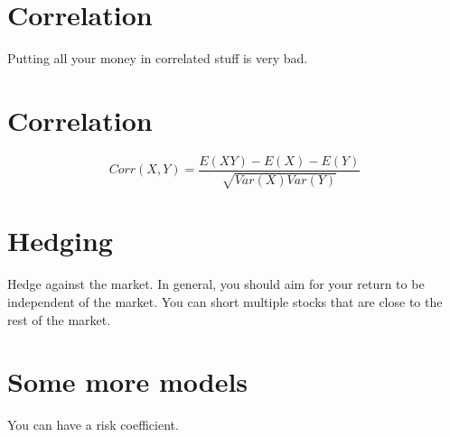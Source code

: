 \documentclass{article}
\begin{document}
\section{Correlation}
Putting all your money in correlated stuff is very bad.
\section{Correlation}
$$Corr(X,Y)=\frac{E(XY)-E(X)-E(Y)}{\sqrt{Var(X)Var(Y)}}$$
\section{Hedging}
Hedge against the market. In general, you should aim for your return to be independent of the market. You can short multiple stocks that are close to the rest of the market.
\section{Some more models}
You can have a risk coefficient.
\end{document}
